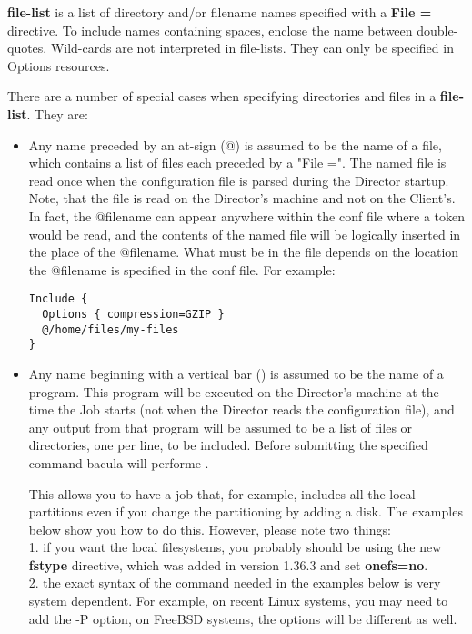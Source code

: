 {\bf \lt{}file-list\gt{}} is a list of directory and/or filename names
specified with a {\bf File =} directive. To include names containing spaces,
enclose the name between double-quotes. Wild-cards are not interpreted
in file-lists. They can only be specified in Options resources.

There are a number of special cases when specifying directories and files in a
{\bf file-list}. They are: 

\begin{itemize}
\item Any name preceded by an at-sign (@) is assumed to be the  name of a
   file, which contains a list of files each preceded by a "File =".  The
   named file is read once when the configuration file is parsed during the
   Director startup.  Note, that the file is read on the Director's machine
   and not on the Client's.  In fact, the @filename can appear anywhere
   within the conf file where a token would be read, and the contents of
   the named file will be logically inserted in the place of the @filename.
   What must be in the file depends on the location the @filename is
   specified in the conf file.  For example:

\footnotesize
\begin{verbatim}
Include {
  Options { compression=GZIP }
  @/home/files/my-files
}
\end{verbatim}
\normalsize

\item Any name beginning with a vertical bar (\vb) is  assumed to be the name of
   a program.  This program will be executed on the Director's machine at
   the time the Job starts (not when the Director reads the configuration
   file), and any output from that program will be assumed to be a list of
   files or directories, one per line, to be included. Before submitting the 
   specified command bacula will performe 
   .

   This allows you to have a job that, for example, includes all the local
   partitions even if you change the partitioning by adding a disk.  The
   examples below show you how to do this.  However, please note two
   things: \\
   1.  if you want the local filesystems, you probably should be
   using the new {\bf fstype} directive, which was added in version 1.36.3 
   and set {\bf onefs=no}.
   \\

   2.  the exact syntax of the command needed in the examples below is very
   system dependent.  For example, on recent Linux systems, you may need to
   add the -P option, on FreeBSD systems, the options will be different as
   well.


\end{itemize}

